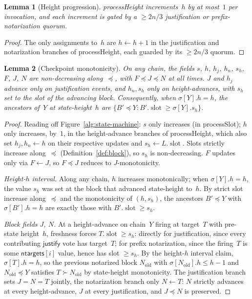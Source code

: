 \ifx\litemode\undefined\documentclass{article}\fi
\newcommand{\slot}[0]{\ensuremath{\operatorname{\mathrm{slot}}}}
\newcommand{\just}{\ensuremath{\mathsf{justify}}\xspace}
\newcommand{\ntargets}{\mathsf{ntargets}}
\newcommand{\processSlot}{\textsf{processSlot}\xspace}
\newcommand{\processHeight}{\textsf{processHeight}\xspace}
\theoremstyle{plain}
\newtheorem{lemma}{Lemma}
\theoremstyle{definition}
\theoremstyle{remark}
\begin{document}
\begin{lemma}[Height progression]\label{lem:heightprog}
\processHeight increments~$h$ by at most~$1$ per invocation, and each increment is gated by a $\geq 2n/3$ justification or prefix-notarization quorum.
\end{lemma}

\begin{proof}
The only assignments to~$h$ are $h \gets h + 1$ in the justification and notarization branches of \processHeight, each guarded by its $\geq 2n/3$ quorum.
\end{proof}

\begin{lemma}[Checkpoint monotonicity]\label{lem:slotmono}
On any chain, the fields $s$, $h$, $h_j$, $h_n$, $s_h$, $F$, $J$, $N$ are non-decreasing along~$\preceq$, with $F \preceq J \preceq N$ at all times.
$J$ and $h_j$ advance only on justification events, and $h_n, s_h$ only on height-advances, with $s_h$ set to the slot of the advancing block.
Consequently, when $\sigma[Y].h = h$, the ancestors of~$Y$ at state-height~$h$ are $\{B' \preceq Y : B'.\slot \geq \sigma[Y].s_h\}$.
\end{lemma}

\begin{proof}
Reading off Figure~\ref{alg:state-machine}: $s$ only increases (in \processSlot); $h$ only increases, by~$1$, in the height-advance branches of \processHeight, which also set $h_j, h_n \gets h$ on their respective updates and $s_h \gets L.\slot$.
Slots strictly increase along~$\preceq$ (Definition~\ref{def:block}), so $s_h$ is non-decreasing.
$F$ updates only via $F \gets J$, so $F \preceq J$ reduces to $J$-monotonicity.

\emph{Height-$h$ interval.}
Along any chain, $h$ increases monotonically; when $\sigma[Y].h = h$, the value $s_h$ was set at the block that advanced state-height to~$h$.
By strict slot increase along~$\preceq$ and the monotonicity of $(h, s_h)$, the ancestors $B' \preceq Y$ with $\sigma[B'].h = h$ are exactly those with $B'.\slot \geq s_h$.

\emph{Block fields $J$, $N$.}
At a height-advance on chain~$Y$ firing at target~$T$ with pre-state height~$h$, freshness forces $T.\slot \geq s_h$: directly for justification, since every contributing \just vote has target~$T$; for prefix notarization, since the firing~$T$ is some $\ntargets[i]$ value, hence has slot $\geq s_h$.
By the height-$h$ interval claim, $\sigma[T].h = h$, so the previous notarized block $N_{\mathrm{old}}$ with $\sigma[N_{\mathrm{old}}].h \leq h-1$ and $N_{\mathrm{old}} \preceq Y$ satisfies $T \succ N_{\mathrm{old}}$ by state-height monotonicity.
The justification branch sets $J = N = T$ jointly, the notarization branch only $N \gets T$: $N$ strictly advances at every height-advance, $J$ at every justification, and $J \preceq N$ is preserved.
\end{proof}
\end{document}
